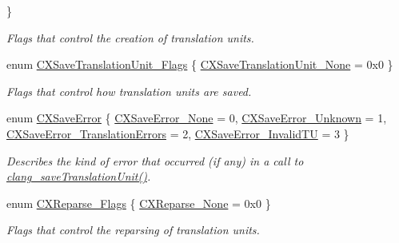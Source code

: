\begin{DoxyCompactItemize}
 \}
\begin{DoxyCompactList}\small\item\em Flags that control the creation of translation units. \end{DoxyCompactList}\item 
enum \mbox{\hyperlink{group__CINDEX__TRANSLATION__UNIT_ga4c8b0a3c559d14f80f78aba8c185e711}{C\+X\+Save\+Translation\+Unit\+\_\+\+Flags}} \{ \mbox{\hyperlink{group__CINDEX__TRANSLATION__UNIT_gga4c8b0a3c559d14f80f78aba8c185e711ad7f0f3242cc41d1b2e49fd0675031cf9}{C\+X\+Save\+Translation\+Unit\+\_\+\+None}} = 0x0
 \}
\begin{DoxyCompactList}\small\item\em Flags that control how translation units are saved. \end{DoxyCompactList}\item 
enum \mbox{\hyperlink{group__CINDEX__TRANSLATION__UNIT_ga7016a2cf0a256f239a8887d1251d5c23}{C\+X\+Save\+Error}} \{ \mbox{\hyperlink{group__CINDEX__TRANSLATION__UNIT_gga7016a2cf0a256f239a8887d1251d5c23aa14ffe92a7eb85cc68cfe7ef5460f3e6}{C\+X\+Save\+Error\+\_\+\+None}} = 0, 
\mbox{\hyperlink{group__CINDEX__TRANSLATION__UNIT_gga7016a2cf0a256f239a8887d1251d5c23a4e275864366f48819d043a30896210a8}{C\+X\+Save\+Error\+\_\+\+Unknown}} = 1, 
\mbox{\hyperlink{group__CINDEX__TRANSLATION__UNIT_gga7016a2cf0a256f239a8887d1251d5c23a9e4c3d094b8f2f39899bdefca43ce7f6}{C\+X\+Save\+Error\+\_\+\+Translation\+Errors}} = 2, 
\mbox{\hyperlink{group__CINDEX__TRANSLATION__UNIT_gga7016a2cf0a256f239a8887d1251d5c23a699cf0378b2e5417eaf51dc667accd41}{C\+X\+Save\+Error\+\_\+\+Invalid\+TU}} = 3
 \}
\begin{DoxyCompactList}\small\item\em Describes the kind of error that occurred (if any) in a call to {\ttfamily \mbox{\hyperlink{group__CINDEX__TRANSLATION__UNIT_ga3abe9df81f9fef269d737d82720c1d33}{clang\+\_\+save\+Translation\+Unit()}}}. \end{DoxyCompactList}\item 
enum \mbox{\hyperlink{group__CINDEX__TRANSLATION__UNIT_gabbc92e66e3a3b22de7ead07cf01678b9}{C\+X\+Reparse\+\_\+\+Flags}} \{ \mbox{\hyperlink{group__CINDEX__TRANSLATION__UNIT_ggabbc92e66e3a3b22de7ead07cf01678b9a72314cac7f41f5087a103175af95e7ce}{C\+X\+Reparse\+\_\+\+None}} = 0x0
 \}
\begin{DoxyCompactList}\small\item\em Flags that control the reparsing of translation units. \end{DoxyCompactList}\item 

\end{DoxyCompactItemize}
